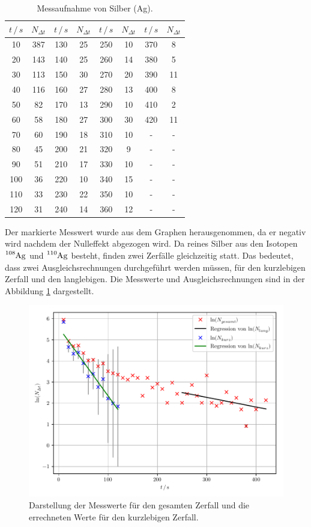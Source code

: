 \begin{table}[H]
  \centering
  \caption{Messaufnahme von Silber (Ag).}
  \label{tab:2}
  \begin{tabular}{c c c c c c c c}
    \toprule
    $t \, /\, s$& $N_{\Delta t}$& $t \, /\, s$& $N_{\Delta t}$ & $t \, /\, s$& $N_{\Delta t}$ & $t \, /\, s$& $N_{\Delta t}$ \\
    \midrule
    10 & 387 & 130 & 25 & 250 & 10 & 370 & 8\\
    20 & 143 & 140 & 25 & 260 & 14 & 380 & 5\\
    30 & 113 & 150 & 30 & 270 & 20 & 390 & 11\\
    40 & 116 & 160 & 27 & 280 & 13 & 400 & 8\\
    50 & 82 & 170 & 13 & 290 & 10 & 410 & \cellcolor{red}2\\
    60 & 58 & 180 & 27 & 300 & 30 & 420 & 11\\
    70 & 60 & 190 & 18 & 310 & 10 & -&-\\
    80 & 45 & 200 & 21 & 320 & 9 & -& - \\
    90 & 51 & 210 & 17 & 330 & 10 & -& -\\
    100 & 36 & 220 & 10 & 340 & 15 &- &-\\
    110 & 33 & 230 & 22 & 350 & 10 &- &-\\
    120 & 31 & 240 & 14 & 360 & 12 &- &-\\
    \bottomrule
  \end{tabular}
\end{table}

Der markierte Messwert wurde aus dem Graphen herausgenommen, da er negativ wird
nachdem der Nulleffekt abgezogen wird.
Da reines Silber aus den Isotopen $\ce{^{108}Ag}$ und $\ce{^{110}Ag}$ besteht, finden zwei Zerfälle
gleichzeitig statt. Das bedeutet, dass zwei Ausgleichsrechnungen
durchgeführt werden müssen, für den kurzlebigen Zerfall und den langlebigen.
Die Messwerte und Ausgleichsrechnungen sind in der Abbildung \ref{abb:4} dargestellt.

\begin{figure}[H]
  \centering
  \includegraphics{plot1.pdf}
  \caption{Darstellung der Messwerte für den gesamten Zerfall und die errechneten Werte
  für den kurzlebigen Zerfall.}
  \label{abb:4}
\end{figure}

